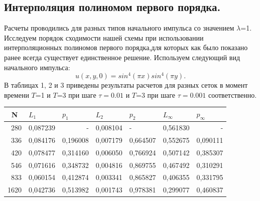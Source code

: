 \documentclass[14pt]{article}
\begin{document}
\subsection{Интерполяция полиномом первого порядка.}
Расчеты проводились для разных типов начального импульса со значением $\lambda$=1. Исследуем порядок сходимости нашей схемы при использовании интерполяционных полиномов первого порядка,для которых как было показано ранее всегда существует единственное решение. Используем следующий вид начального импульса:
\begin{equation}
u(x,y,0) = sin^4(\pi x)sin^4(\pi y).
\end{equation}
В таблицах 1, 2 и 3 приведены результаты расчетов для разных сеток в момент времени $T$=1 и $T$=3 при шаге $\tau=0.01$ и $T$=3 при шаге $\tau=0.001$ соответственно.
\begin{table}[!h!]
\begin{tabular}{|r|r|r|r|r|r|r|}
\hline
\multicolumn{1}{|c|}{N} & \multicolumn{1}{l|}{$L_1$}        & \multicolumn{1}{l|}{$p_1$} & \multicolumn{1}{l|}{$L_2$}     & \multicolumn{1}{l|}{$p_2$} & \multicolumn{1}{l|}{$L_\infty$} & \multicolumn{1}{l|}{$p_\infty$} \\ \hline
280                     & 0,087239                         & -                         & 0,008104                      & \multicolumn{1}{l|}{-}    & 0,561830                    & -                           \\ \hline
336                     & 0,084176                         & 0,196008                  & 0,007179                      & 0,664507                  & 0,552675                    & 0,090111                    \\ \hline
420                     & 0,078477                         & 0,314160                  & 0,006050                      & 0,766924                  & 0,507142                    & 0,385307                    \\ \hline
546                     & 0,071616                         & 0,348732                  & 0,004816                      & 0,869755                  & 0,467492                    & 0,310291                    \\ \hline
833                     & 0,060154                         & 0,412874                  & 0,003341                      & 0,865827                  & 0,406355                    & 0,331795                    \\ \hline
1620                    & 0,042736                         & 0,513982                  & 0,001743                      & 0,978381                  & 0,299077                    & 0,460837                    \\ \hline

\end{tabular}
\end{table}
\end{document}

